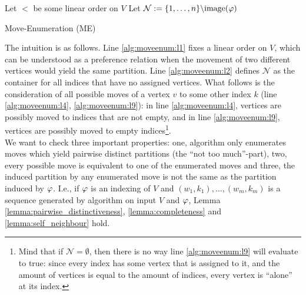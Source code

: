 \begin{algorithm}[ht]
    \SetAlgoLined
    \DontPrintSemicolon
    Let $<$ be some linear order on $V$ \label{alg:moveenum:l1} \;
    Let $\mathcal{N} := \{1,\dots,n\}\backslash \mathrm{image}(\varphi)$  \label{alg:moveenum:l2} \;
    \caption{Move-Enumeration (ME)} \label{alg:moveenum}
\end{algorithm}

The intuition is as follows. Line \ref{alg:moveenum:l1} fixes a linear order on $V$, which can be understood as a preference relation when the movement of two different vertices would yield the same partition. Line \ref{alg:moveenum:l2} defines $\mathcal{N}$ as the container for all indices that have no assigned vertices. What follows is the consideration of all possible moves of a vertex $v$ to some other index $k$ (line \ref{alg:moveenum:l4}, \ref{alg:moveenum:l9}): in line \ref{alg:moveenum:l4}, vertices are possibly moved to indices that are not empty, and in line \ref{alg:moveenum:l9}, vertices are possibly moved to empty indices\footnote{Mind that if $\mathcal{N} = \emptyset$, then there is no way line \ref{alg:moveenum:l9} will evaluate to true: since every index has some vertex that is assigned to it, and the amount of vertices is equal to the amount of indices, every vertex is ``alone'' at its index.}.\\
We want to check three important properties: one, algorithm \emph{} only enumerates moves which yield pairwise distinct partitions (the ``not too much''-part), two, every possible move is equivalent to one of the enumerated moves and three, the induced partition by any enumerated move is not the same as the partition induced by $\varphi$. I.e., if $\varphi$ is an indexing of $V$ and $(w_1,k_1),\dots,(w_m,k_m)$ is a sequence generated by algorithm \emph{} on input $V$ and $\varphi$, Lemma \ref{lemma:pairwise_distinctiveness}, \ref{lemma:completeness} and \ref{lemma:self_neighbour} hold.

